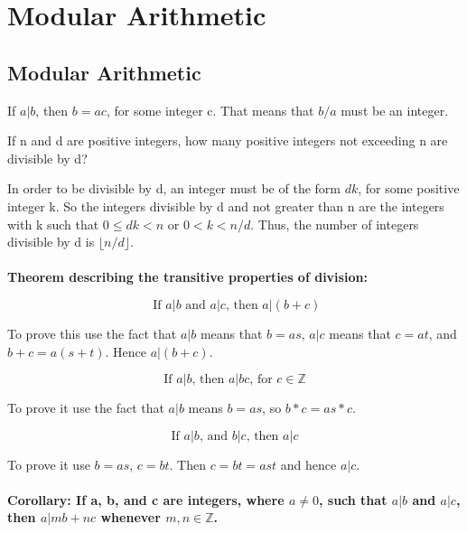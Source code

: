\section{Modular Arithmetic}



\subsection{Modular Arithmetic}

If $a|b$, then $b = ac$, for some integer c. That means that $b/a$ must be an integer.

If n and d are positive integers, how many positive integers not exceeding n are divisible by d?

In order to be divisible by d, an integer must be of the form $dk$, for some positive integer k.
So the integers divisible by d and not greater than n are the integers with k such that $0 \leq dk < n$
or $0 < k < n/d$.
Thus, the number of integers divisible by d is $\lfloor n / d \rfloor$.
\\~\\


\textbf{Theorem describing the transitive properties of division:}

\begin{equation}
\text{ If $a|b$ and $a|c$, then $a|(b+c)$}
\end{equation}

To prove this use the fact that $a|b$ means that $b = as$, $a|c$ means that $c=at$,
and $b+c = a(s+t)$.
Hence $a|(b+c)$.

\begin{equation}
\text{If $a|b$, then $a|bc$, for $c \in \mathbb{Z}$}
\end{equation}

To prove it use the fact that $a|b$ means $b = as$, so $b*c = as * c$.

\begin{equation}
\text{If $a|b$, and $b|c$, then $a|c$}
\end{equation}

To prove it use $b = as$, $c = bt$. Then $c = bt = ast$ and hence $a|c$.
\\~\\

\textbf{Corollary: If a, b, and c are integers, where $a \neq 0$, such that $a|b$ and $a|c$, then $a|mb + nc$ whenever $m, n \in \mathbb{Z}$.}

